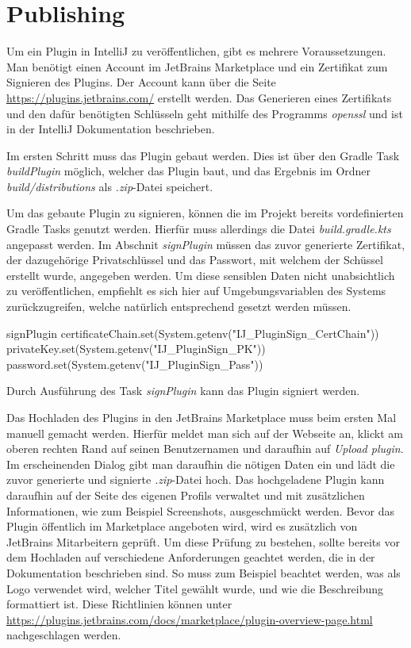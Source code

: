 \section{Publishing}
\label{sec:EntwicklungIntelliJ_Publishing}

Um ein Plugin in IntelliJ zu veröffentlichen, gibt es mehrere Voraussetzungen.
Man benötigt einen Account im JetBrains Marketplace und ein Zertifikat
zum Signieren des Plugins. Der Account kann über die Seite 
\url{https://plugins.jetbrains.com/} erstellt werden. Das Generieren eines
Zertifikats und den dafür benötigten Schlüsseln geht mithilfe des 
Programms \emph{openssl} und ist in der IntelliJ Dokumentation beschrieben.

Im ersten Schritt muss das Plugin gebaut werden. Dies ist über den
Gradle Task \emph{buildPlugin} möglich, welcher das Plugin baut, und
das Ergebnis im Ordner \emph{build/distributions} als \emph{.zip}-Datei
speichert.

Um das gebaute Plugin zu signieren, können die im Projekt bereits vordefinierten
Gradle Tasks genutzt werden. Hierfür muss allerdings die Datei 
\emph{build.gradle.kts} angepasst werden. Im Abschnit \emph{signPlugin}
müssen das zuvor generierte Zertifikat, der dazugehörige Privatschlüssel
und das Passwort, mit welchem der Schüssel erstellt wurde, angegeben werden.
Um diese sensiblen Daten nicht unabsichtlich zu veröffentlichen, empfiehlt
es sich hier auf Umgebungsvariablen des Systems zurückzugreifen, welche
natürlich entsprechend gesetzt werden müssen.
\begin{JsCode}[numbers=none]
    signPlugin {
        certificateChain.set(System.getenv("IJ_PluginSign_CertChain"))
        privateKey.set(System.getenv("IJ_PluginSign_PK"))
        password.set(System.getenv("IJ_PluginSign_Pass"))
    }
\end{JsCode}
Durch Ausführung des Task \emph{signPlugin} kann das Plugin signiert werden.

Das Hochladen des Plugins in den JetBrains Marketplace muss beim ersten Mal
manuell gemacht werden. Hierfür meldet man sich auf der Webseite an,
klickt am oberen rechten Rand auf seinen Benutzernamen und daraufhin
auf \emph{Upload plugin}. Im erscheinenden Dialog gibt man
daraufhin die nötigen Daten ein und lädt die zuvor generierte und signierte
\emph{.zip}-Datei hoch.
Das hochgeladene Plugin kann daraufhin auf der Seite des eigenen Profils
verwaltet und mit zusätzlichen Informationen, wie zum Beispiel Screenshots,
ausgeschmückt werden.
Bevor das Plugin öffentlich im Marketplace angeboten wird, wird es 
zusätzlich von JetBrains Mitarbeitern geprüft. Um diese Prüfung
zu bestehen, sollte bereits vor dem Hochladen auf verschiedene
Anforderungen geachtet werden, die in der Dokumentation beschrieben sind.
So muss zum Beispiel beachtet werden, was als Logo verwendet wird, welcher
Titel gewählt wurde, und wie die Beschreibung formattiert ist.
Diese Richtlinien können unter \url{https://plugins.jetbrains.com/docs/marketplace/plugin-overview-page.html}
nachgeschlagen werden.

